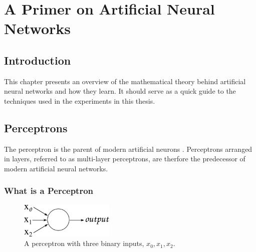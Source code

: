 \chapter{A Primer on Artificial Neural Networks} %

\label{Chapter2} %


\section{Introduction}
This chapter presents an overview of the mathematical theory behind artificial neural networks and how they learn. It should serve as a quick guide to the techniques used in the experiments in this thesis.

\section{Perceptrons}
\label{sec:percep}
The perceptron is the parent of modern artificial neurons \cite{rosenblatt1958perceptron}.
Perceptrons arranged in layers, referred to as multi-layer perceptrons, are therfore the predecessor of modern artificial neural networks.

\subsection{What is a Perceptron}



\begin{figure}
	\centering
	\includegraphics[width=0.4\textwidth]{Figs/intro2dl/perceptron.png}
	
	\caption{A perceptron with three binary inputs, $x_0, x_1, x_2$.}
	\label{fig:perceptron}
\end{figure}

